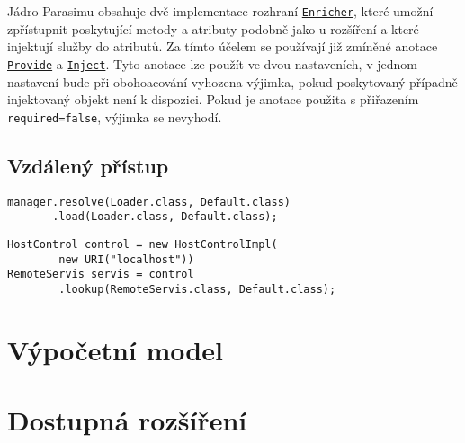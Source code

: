 Jádro Parasimu obsahuje dvě implementace rozhraní \href{https://github.com/sybila/parasim/blob/master/core/src/main/java/org/sybila/parasim/core/spi/enrichment/Enricher.java}{\texttt{Enricher}},
které umožní zpřístupnit poskytující metody a atributy podobně jako u rozšíření 
a které injektují služby do atributů. Za tímto účelem se používají již zmíněné anotace \href{https://github.com/sybila/parasim/blob/master/core/src/main/java/org/sybila/parasim/core/annotation/Provide.java}{\texttt{Provide}} a \href{https://github.com/sybila/parasim/blob/master/core/src/main/java/org/sybila/parasim/core/annotation/Inject.java}{\texttt{Inject}}.
Tyto anotace lze použít ve dvou nastaveních, v jednom nastavení bude při obohoacování
vyhozena výjimka, pokud poskytovaný případně injektovaný objekt není k dispozici.
Pokud je anotace použita s přiřazením \texttt{required=false}, výjimka se nevyhodí.

\subsection{Vzdálený přístup}

\begin{lstlisting}[label={code:remote}, caption={Spuštění serveru}]
manager.resolve(Loader.class, Default.class)
	   .load(Loader.class, Default.class);
\end{lstlisting}

\begin{lstlisting}[label={code:remote}, caption={Přístup ke vzdálenému serveru}]
HostControl control = new HostControlImpl(
		new URI("localhost"))
RemoteServis servis = control
		.lookup(RemoteServis.class, Default.class);
\end{lstlisting}

\section{Výpočetní model}

\section{Dostupná rozšíření}
